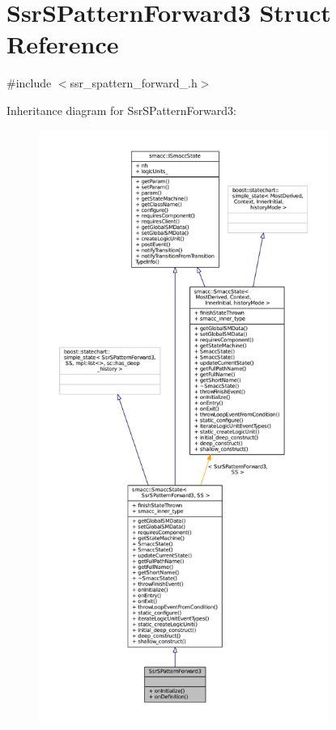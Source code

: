\hypertarget{structSsrSPatternForward3}{}\section{Ssr\+S\+Pattern\+Forward3 Struct Reference}
\label{structSsrSPatternForward3}


{\ttfamily \#include $<$ssr\+\_\+spattern\+\_\+forward\+\_.\+h$>$}



Inheritance diagram for Ssr\+S\+Pattern\+Forward3\+:
\nopagebreak
\begin{figure}[H]
\begin{center}
\leavevmode
\includegraphics[height=550pt]{structSsrSPatternForward3__inherit__graph}
\end{center}
\end{figure}


